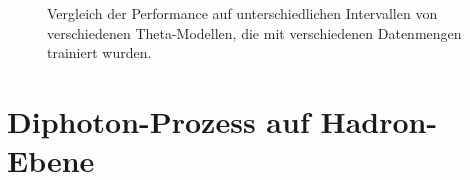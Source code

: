 \begin{figure}[H]
	\caption{Vergleich der Performance auf unterschiedlichen Intervallen von verschiedenen Theta-Modellen, die mit verschiedenen Datenmengen trainiert wurden.}
\end{figure}
\section{Diphoton-Prozess auf Hadron-Ebene}
